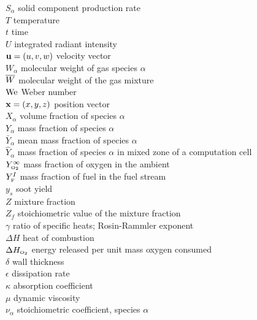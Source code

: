 \begin{tabbing}
$S_\alpha$                \> solid component production rate \\
$T$                       \> temperature \\
$t$                       \> time           \\
$U$                       \> integrated radiant intensity \\
${\bf u}=(u,v,w)$             \> velocity vector  \\
$W_\alpha$                \> molecular weight of gas species $\alpha$ \\
$\overline{W}$                     \> molecular weight of the gas mixture \\
$\hbox{We}$                     \> Weber number \\
${\bf x}=(x,y,z)$             \> position vector  \\
$X_\alpha$                \> volume fraction of species $\alpha$   \\
$Y_\alpha$                \> mass fraction of species $\alpha$   \\
$\bar{Y}_\alpha$          \> mean mass fraction of species $\alpha$   \\
$\hat{Y}_\alpha$          \> mass fraction of species $\alpha$ in mixed zone of a computation cell   \\
$Y_{\tiny \hbox{O}_2}^\infty$          \> mass fraction of oxygen in the ambient   \\
$Y_{\tiny \hbox{F}}^I$                  \> mass fraction of fuel in the fuel stream   \\
$y_s$                     \> soot yield \\
$Z$                       \> mixture fraction   \\
$Z_f$                     \> stoichiometric value of the mixture fraction   \\
$\gamma$                  \> ratio of specific heats; Rosin-Rammler exponent \\
$\Delta H$                \> heat of combustion \\
$\Delta H_{\tiny \hbox{O}_2}$          \> energy released per unit mass oxygen consumed \\
$\delta$                  \> wall thickness \\
$\epsilon$                \> dissipation rate \\
$\kappa$                  \> absorption coefficient \\
$\mu$                     \> dynamic viscosity \\
$\nu_\alpha$              \> stoichiometric coefficient, species $\alpha$ \\

\end{tabbing}
